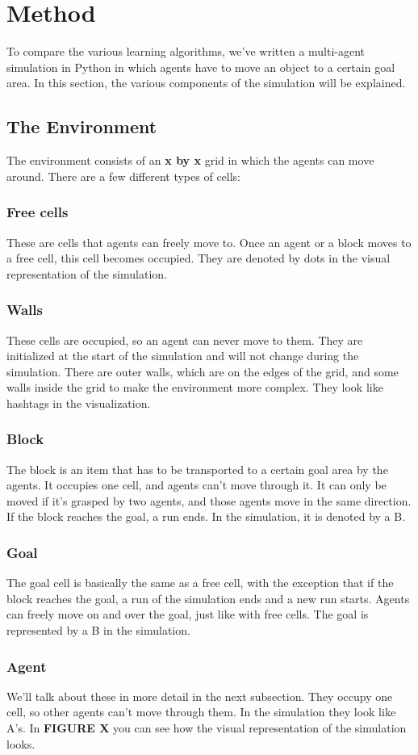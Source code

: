 \section{Method}
To compare the various learning algorithms, we've written a multi-agent simulation in Python in which agents have to move an object to a certain goal area. In this section, the various components of the simulation will be explained.
\subsection{The Environment}
The environment consists of an \textbf{x by x} grid in which the agents can move around. There are a few different types of cells:
\subsubsection*{Free cells}
These are cells that agents can freely move to. Once an agent or a block moves to a free cell, this cell becomes occupied. They are denoted by dots in the visual representation of the simulation.
\subsubsection*{Walls}
These cells are occupied, so an agent can never move to them. They are initialized at the start of the simulation and will not change during the simulation. There are outer walls, which are on the edges of the grid, and some walls inside the grid to make the environment more complex. They look like hashtags in the visualization.
\subsubsection*{Block}
The block is an item that has to be transported to a certain goal area by the agents. It occupies one cell, and agents can't move through it. It can only be moved if it's grasped by two agents, and those agents move in the same direction. If the block reaches the goal, a run ends. In the simulation, it is denoted by a B.
\subsubsection*{Goal}
The goal cell is basically the same as a free cell, with the exception that if the block reaches the goal, a run of the simulation ends and a new run starts. Agents can freely move on and over the goal, just like with free cells. The goal is represented by a B in the simulation.
\subsubsection*{Agent}
We'll talk about these in more detail in the next subsection. They occupy one cell, so other agents can't move through them. In the simulation they look like A's.
In \textbf{FIGURE X} you can see how the visual representation of the simulation looks.
